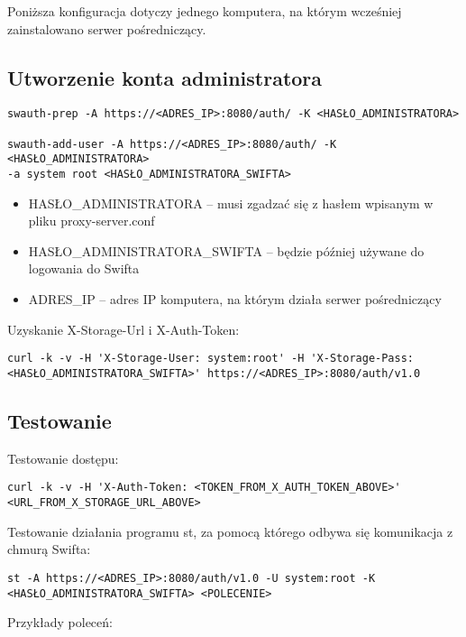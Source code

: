 \documentclass[12pt]{article}
\begin{document}
Poniższa konfiguracja dotyczy jednego komputera, na którym wcześniej zainstalowano serwer pośredniczący.

\subsection{Utworzenie konta administratora}

\begin{verbatim}
swauth-prep -A https://<ADRES_IP>:8080/auth/ -K <HASŁO_ADMINISTRATORA>

swauth-add-user -A https://<ADRES_IP>:8080/auth/ -K <HASŁO_ADMINISTRATORA> 
-a system root <HASŁO_ADMINISTRATORA_SWIFTA>
\end{verbatim}

\begin{itemize}
\item HASŁO\_ADMINISTRATORA – musi zgadzać się z hasłem wpisanym w pliku proxy-server.conf
\item HASŁO\_ADMINISTRATORA\_SWIFTA – będzie później używane do logowania do Swifta
\item ADRES\_IP – adres IP komputera, na którym działa serwer pośredniczący
\end{itemize}

Uzyskanie X-Storage-Url i X-Auth-Token:

\begin{verbatim}
curl -k -v -H 'X-Storage-User: system:root' -H 'X-Storage-Pass: 
<HASŁO_ADMINISTRATORA_SWIFTA>' https://<ADRES_IP>:8080/auth/v1.0
\end{verbatim}

\subsection{Testowanie}

Testowanie dostępu:

\begin{verbatim}
curl -k -v -H 'X-Auth-Token: <TOKEN_FROM_X_AUTH_TOKEN_ABOVE>' 
<URL_FROM_X_STORAGE_URL_ABOVE>
\end{verbatim}

Testowanie działania programu st, za pomocą którego odbywa się komunikacja z chmurą Swifta:
	
\begin{verbatim}
st -A https://<ADRES_IP>:8080/auth/v1.0 -U system:root -K 
<HASŁO_ADMINISTRATORA_SWIFTA> <POLECENIE>
\end{verbatim}

Przykłady poleceń:
\end{document}
